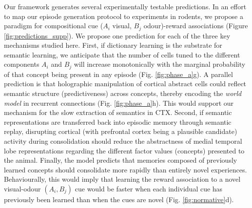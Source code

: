 \documentclass{article}
\begin{document}
\newline\newline
Our framework generates several experimentally testable predictions. In an effort to map our episode generation protocol to experiments in rodents, we propose a paradigm for compositional cue ($A_i$ visual, $B_j$ odour)-reward associations (Figure \ref{fig:predictions_supp}). We propose one prediction for each of the three key mechanisms studied here. First, if dictionary learning is the substrate for semantic learning, we anticipate that the number of cells tuned to the different components $A_i$ and $B_j$ will increase monotonically with the marginal probability of that concept being present in any episode (Fig. \ref{fig:phase_a}g). A parallel prediction is that holographic manipulation of cortical abstract cells could reflect semantic structure (predictiveness) across concepts, thereby encoding the \textit{world model} in recurrent connections (Fig. \ref{fig:phase_a}h). This would support our mechanism for the slow extraction of semantics in CTX. Second, if semantic representations are transferred back into episodic memory through semantic replay, disrupting cortical (with prefrontal cortex being a plausible candidate) activity during consolidation should reduce the abstractness  of medial temporal lobe representations regarding the different factor values (concepts) presented to the animal. Finally, the model predicts that memories composed of previously learned concepts should consolidate more rapidly than entirely novel experiences. Behaviourally, this would imply that learning the reward association to a novel visual-odour $(A_i, B_j)$ cue would be faster when each individual cue has previously been learned than when the cues are novel (Fig. \ref{fig:normative}d).
\newline\newline
\end{document}
